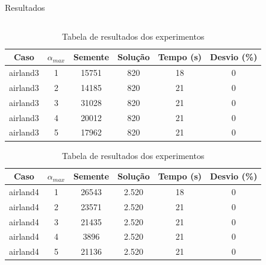 \documentclass[xcolor=dvipsnames]{beamer}
\begin{document}
\begin{frame}[allowframebreaks]{Resultados}
\begin{table}
\begin{tabular}{|c|c|c|c|c|c|}
\end{tabular}
\label{tab}
\end{table} 

\begin{table}

\centering

\caption{Tabela de resultados dos experimentos}

\begin{tabular}{|c|c|c|c|c|c|}

\hline %

Caso & $\alpha_{max}$ & Semente & Solução & Tempo (s) & Desvio (\%)  \\


\hline
airland3 & 1 & 15751 & 820 & 18 & 0 \\ 
airland3 & 2 & 14185 & 820 & 21 & 0 \\ 
airland3 & 3 & 31028 & 820 & 21 & 0 \\ 
airland3 & 4 & 20012 & 820 & 21 & 0 \\ 
airland3 & 5 & 17962 & 820 & 21 & 0 \\ 
\hline

\end{tabular}
\label{tab}
\end{table} 

\begin{table}

\centering

\caption{Tabela de resultados dos experimentos}

\begin{tabular}{|c|c|c|c|c|c|}

\hline %

Caso & $\alpha_{max}$ & Semente & Solução & Tempo (s) & Desvio (\%)  \\

\hline
airland4 & 1 & 26543 & 2.520 & 18 & 0 \\ 
airland4 & 2 & 23571 & 2.520 & 21 & 0 \\ 
airland4 & 3 & 21435 & 2.520 & 21 & 0 \\ 
airland4 & 4 & 3896 & 2.520 & 21 & 0 \\ 
airland4 & 5 & 21136 & 2.520 & 21 & 0 \\ 
\hline

\end{tabular}
\label{tab}
\end{table} 

\begin{table}


\end{table}
\end{frame}
\end{document}
